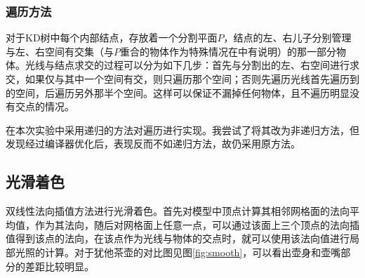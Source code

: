 \subsubsection {遍历方法}
对于KD树中每个内部结点，存放着一个分割平面$P$，结点的左、右儿子分别管理与左、右空间有交集（与$P$重合的物体作为特殊情况在\cite{wald2006building}中有说明）的那一部分物体。光线与结点求交的过程可以分为如下几步：首先与分割出的左、右空间进行求交，如果仅与其中一个空间有交，则只遍历那个空间；否则先遍历光线首先遍历到的空间，后遍历另外那半个空间。这样可以保证不漏掉任何物体，且不遍历明显没有交点的情况。
\par 在本次实验中采用递归的方法对遍历进行实现。我尝试了将其改为非递归方法，但发现经过编译器优化后，表现反而不如递归方法，故仍采用原方法。

\subsection {光滑着色}
双线性法向插值方法进行光滑着色。首先对模型中顶点计算其相邻网格面的法向平均值，作为其法向，随后对网格面上任意一点，可以通过该面上三个顶点的法向插值得到该点的法向，在该点作为光线与物体的交点时，就可以使用该法向值进行局部光照的计算。对于犹他茶壶的对比图见图\ref{fig:smooth}，可以看出壶身和壶嘴部分的差距比较明显。

